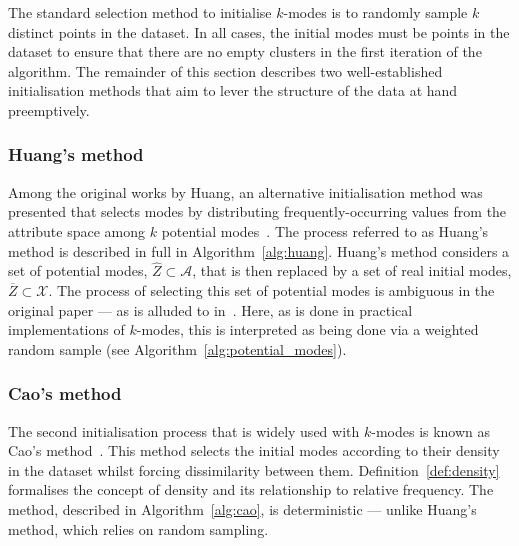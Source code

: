 The standard selection method to initialise \(k\)-modes is to randomly sample
\(k\) distinct points in the dataset. In all cases, the initial modes must be
points in the dataset to ensure that there are no empty clusters in the first
iteration of the algorithm. The remainder of this section describes two
well-established initialisation methods that aim to lever the structure of the
data at hand preemptively.

\subsubsection{Huang's method}\label{subsec:huang}

Among the original works by Huang, an alternative initialisation method was
presented that selects modes by distributing frequently-occurring values from
the attribute space among \(k\) potential modes~\cite{Huang1998}. The process
referred to as Huang's method is described in full in Algorithm~\ref{alg:huang}.
Huang's method considers a set of potential modes, \(\widehat Z \subset \mathcal
A\), that is then replaced by a set of real initial modes, \(\overline Z \subset
\mathcal X\). The process of selecting this set of potential modes is ambiguous
in the original paper --- as is alluded to in~\cite{Jiang2016}.  Here, as is
done in practical implementations of \(k\)-modes, this is interpreted as being
done via a weighted random sample (see Algorithm~\ref{alg:potential_modes}).



\subsubsection{Cao's method}\label{subsec:cao}

The second initialisation process that is widely used with \(k\)-modes is known
as Cao's method~\cite{Cao2009}. This method selects the initial modes according
to their density in the dataset whilst forcing dissimilarity between them.
Definition~\ref{def:density} formalises the concept of density and its
relationship to relative frequency. The method, described in
Algorithm~\ref{alg:cao}, is deterministic --- unlike Huang's method, which
relies on random sampling.

